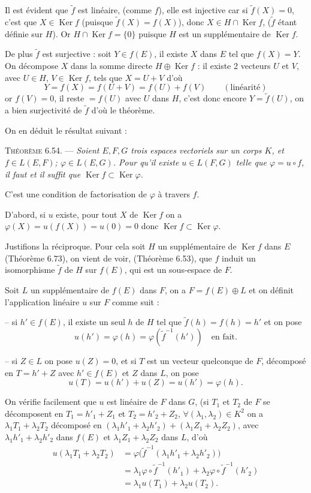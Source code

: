 Il est évident que $\widetilde f$ est linéaire, (comme $f$), elle est injective car si $\widetilde f(X)=0$, c'est que $X\in\operatorname{Ker}f$ (puisque $\widetilde f(X)=f(X)$), donc $X\in H\cap\operatorname{Ker}f$, ($\widetilde f$ étant définie sur $H$). Or $H\cap\operatorname{Ker}f=\{0\}$ puisque $H$ est un supplémentaire de $\operatorname{Ker}f$.

De plus $\widetilde f$ est surjective : soit $Y\in f(E)$, il existe $X$ dans $E$ tel que $f(X)=Y$. On décompose $X$ dans la somme directe $H\oplus\operatorname{Ker}f$ : il existe 2 vecteurs $U$ et $V$, avec $U\in H$, $V\in\operatorname{Ker}f$, tels que $X=U+V$ d'où
\[
Y=f(X)=f(U+V)=f(U)+f(V)\qquad(\text{linéarité})
\]
or $f(V)=0$, il reste $=f(U)$ avec $U$ dans $H$, c'est donc encore $Y=\widetilde f(U)$, on a bien surjectivité de $\widetilde f$ d'où le théorème. \bookend

On en déduit le résultat suivant :

\medskip\noindent\textsc{Théorème 6.54.} --- \emph{Soient $E,F,G$ trois espaces vectoriels sur un corps $K$, et $f\in L(E,F)$; $\varphi\in L(E,G)$. Pour qu'il existe $u\in L(F,G)$ telle que $\varphi=u\circ f$, il faut et il suffit que $\operatorname{Ker}f\subset\operatorname{Ker}\varphi$.}

C'est une condition de factorisation de $\varphi$ à travers $f$.

D'abord, si $u$ existe, pour tout $X$ de $\operatorname{Ker}f$ on a $\varphi(X)=u(f(X))=u(0)=0$ donc $\operatorname{Ker}f\subset\operatorname{Ker}\varphi$.

Justifions la réciproque. Pour cela soit $H$ un supplémentaire de $\operatorname{Ker}f$ dans $E$ (Théorème 6.73), on vient de voir, (Théorème 6.53), que $f$ induit un isomorphisme $\widetilde f$ de $H$ sur $f(E)$, qui est un sous-espace de $F$.

Soit $L$ un supplémentaire de $f(E)$ dans $F$, on a $F=f(E)\oplus L$ et on définit l'application linéaire $u$ sur $F$ comme suit :

-- si $h'\in f(E)$, il existe un seul $h$ de $H$ tel que $\widetilde f(h)=f(h)=h'$ et on pose
\[
u(h')=\varphi(h)=\varphi(\widetilde f^{-1}(h'))\quad\text{en fait}.
\]

-- si $Z\in L$ on pose $u(Z)=0$, et si $T$ est un vecteur quelconque de $F$, décomposé en $T=h'+Z$ avec $h'\in f(E)$ et $Z$ dans $L$, on pose
\[
u(T)=u(h')+u(Z)=u(h')=\varphi(h).
\]

On vérifie facilement que $u$ est linéaire de $F$ dans $G$, (si $T_1$ et $T_2$ de $F$ se décomposent en $T_1=h'_1+Z_1$ et $T_2=h'_2+Z_2$, $\forall(\lambda_1,\lambda_2)\in K^2$ on a $\lambda_1T_1+\lambda_2T_2$ décomposé en $(\lambda_1h'_1+\lambda_2h'_2)+(\lambda_1Z_1+\lambda_2Z_2)$, avec $\lambda_1h'_1+\lambda_2h'_2$ dans $f(E)$ et $\lambda_1Z_1+\lambda_2Z_2$ dans $L$, d'où
\begin{align*}
u(\lambda_1T_1+\lambda_2T_2)
&=\varphi\bigl(\widetilde f^{-1}(\lambda_1h'_1+\lambda_2h'_2)\bigr)\\
&=\lambda_1\varphi\circ\widetilde f^{-1}(h'_1)+\lambda_2\varphi\circ\widetilde f^{-1}(h'_2)\\
&=\lambda_1u(T_1)+\lambda_2u(T_2).
\end{align*}


